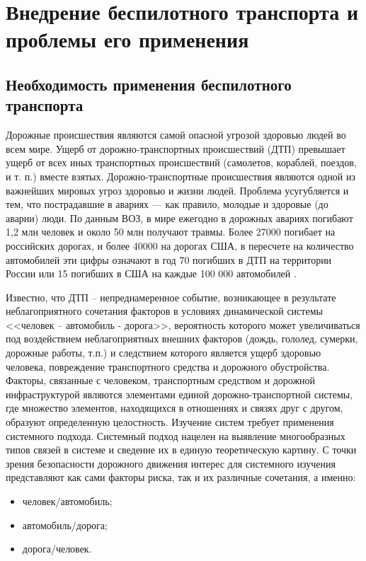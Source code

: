 \chapter{Внедрение беспилотного транспорта и проблемы его применения} \label{chapt2}

\section{Необходимость применения беспилотного транспорта} \label{sect_Need}

Дорожные происшествия являются самой опасной
угрозой здоровью людей во всем мире. Ущерб от до­рожно­-транспортных 
происшествий (ДТП) превышает
ущерб от всех иных транспортных происшествий (само­летов,
кораблей, поездов, и т. п.) вместе взятых. До­рожно-­транспортные
происшествия являются одной из
важнейших мировых угроз здоровью и жизни людей.
Проблема усугубляется и тем, что пострадавшие в ава­риях — как правило, 
молодые и здоровые (до аварии)
люди. По данным ВОЗ, в мире ежегодно в дорожных
авариях погибают 1,2 млн человек и около 50 млн по­лучают 
травмы. Более 27000 погибает на российских
дорогах, и более 40000 на дорогах США, в пересчете
на количество автомобилей эти цифры означают в год
70 погибших в ДТП на территории России или 15 по­гибших 
в США на каждые 100 000 автомобилей \cite{DTP_ukr}.

Известно, что ДТП – непреднамеренное событие, возникающее в результате 
неблагоприятного сочетания факторов в
условиях динамической системы <<человек – автомобиль - дорога>>, вероятность 
которого может увеличиваться под
воздействием неблагоприятных внешних факторов (дождь, гололед, сумерки, дорожные 
работы, т.п.) и следствием
которого является ущерб здоровью человека, повреждение транспортного средства и 
дорожного обустройства.
Факторы, связанные с человеком, транспортным средством и дорожной 
инфраструктурой являются элементами единой
дорожно-транспортной системы, где множество элементов, находящихся в отношениях 
и связях друг с другом,
образуют определенную целостность. Изучение систем требует применения системного 
подхода. Системный подход
нацелен на выявление многообразных типов связей в системе и сведение их в единую 
теоретическую картину.
С точки зрения безопасности дорожного движения интерес для системного изучения 
представляют как сами факторы
риска, так и их различные сочетания, а именно:
\begin{itemize}
  \item человек/автомобиль;
  \item автомобиль/дорога;
  \item дорога/человек.
\end{itemize}

